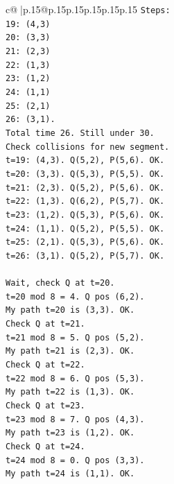 \documentclass{article}
\begin{document}
{\begin{supertabular}{c@{$\;$}|p{.15\linewidth}@{}p{.15\linewidth}p{.15\linewidth}p{.15\linewidth}p{.15\linewidth}p{.15\linewidth}}
{{{\texttt{Steps:} \\
\texttt{19: (4,3)} \\
\texttt{20: (3,3)} \\
\texttt{21: (2,3)} \\
\texttt{22: (1,3)} \\
\texttt{23: (1,2)} \\
\texttt{24: (1,1)} \\
\texttt{25: (2,1)} \\
\texttt{26: (3,1).} \\
\texttt{Total time 26. Still under 30.} \\
\texttt{Check collisions for new segment.} \\
\texttt{t=19: (4,3). Q(5,2), P(5,6). OK.} \\
\texttt{t=20: (3,3). Q(5,3), P(5,5). OK.} \\
\texttt{t=21: (2,3). Q(5,2), P(5,6). OK.} \\
\texttt{t=22: (1,3). Q(6,2), P(5,7). OK.} \\
\texttt{t=23: (1,2). Q(5,3), P(5,6). OK.} \\
\texttt{t=24: (1,1). Q(5,2), P(5,5). OK.} \\
\texttt{t=25: (2,1). Q(5,3), P(5,6). OK.} \\
\texttt{t=26: (3,1). Q(5,2), P(5,7). OK.} \\
\\ 
\texttt{Wait, check Q at t=20.} \\
\texttt{t=20 mod 8 = 4. Q pos (6,2).} \\
\texttt{My path t=20 is (3,3). OK.} \\
\texttt{Check Q at t=21.} \\
\texttt{t=21 mod 8 = 5. Q pos (5,2).} \\
\texttt{My path t=21 is (2,3). OK.} \\
\texttt{Check Q at t=22.} \\
\texttt{t=22 mod 8 = 6. Q pos (5,3).} \\
\texttt{My path t=22 is (1,3). OK.} \\
\texttt{Check Q at t=23.} \\
\texttt{t=23 mod 8 = 7. Q pos (4,3).} \\
\texttt{My path t=23 is (1,2). OK.} \\
\texttt{Check Q at t=24.} \\
\texttt{t=24 mod 8 = 0. Q pos (3,3).} \\
\texttt{My path t=24 is (1,1). OK.} \\
}}}
\end{supertabular}}
\end{document}
